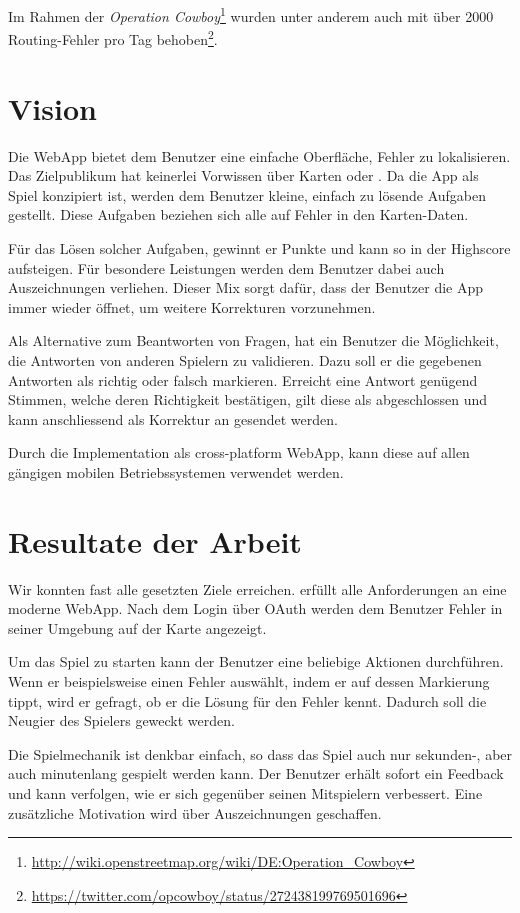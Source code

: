 Im Rahmen der \emph{Operation Cowboy}\footnote{\url{http://wiki.openstreetmap.org/wiki/DE:Operation_Cowboy}} wurden unter anderem auch mit  über 2000 \gls{Routing}-Fehler pro Tag behoben\footnote{\url{https://twitter.com/opcowboy/status/272438199769501696}}.

\section{Vision}
Die \gls{WebApp} \kort{} bietet dem Benutzer eine einfache Oberfläche, Fehler zu lokalisieren.
Das Zielpublikum hat keinerlei Vorwissen über Karten oder .
Da die App als Spiel konzipiert ist, werden dem Benutzer kleine, einfach zu lösende Aufgaben gestellt.
Diese Aufgaben beziehen sich alle auf Fehler in den Karten-Daten.

Für das Lösen solcher Aufgaben, gewinnt er Punkte und kann so in der Highscore aufsteigen.
Für besondere Leistungen werden dem Benutzer dabei auch Auszeichnungen verliehen.
Dieser Mix sorgt dafür, dass der Benutzer die App immer wieder öffnet, um weitere Korrekturen vorzunehmen.

Als Alternative zum Beantworten von Fragen, hat ein Benutzer die Möglichkeit, die Antworten von anderen Spielern zu validieren.
Dazu soll er die gegebenen Antworten als richtig oder falsch markieren.
Erreicht eine Antwort genügend Stimmen, welche deren Richtigkeit bestätigen, gilt diese als abgeschlossen und kann anschliessend als Korrektur an  gesendet werden.

Durch die Implementation als cross-platform \gls{WebApp}, kann diese auf allen gängigen mobilen Betriebssystemen verwendet werden.

\section{Resultate der Arbeit}
Wir konnten fast alle gesetzten Ziele erreichen.
\kort{} erfüllt alle Anforderungen an eine moderne \gls{WebApp}.
Nach dem Login über \gls{OAuth} werden dem Benutzer Fehler in seiner Umgebung auf der Karte angezeigt.

Um das Spiel zu starten kann der Benutzer eine beliebige Aktionen durchführen.
Wenn er beispielsweise einen Fehler auswählt, indem er auf dessen Markierung tippt, wird er gefragt, ob er die Lösung für den Fehler kennt.
Dadurch soll die Neugier des Spielers geweckt werden.

Die Spielmechanik ist denkbar einfach, so dass das Spiel auch nur sekunden-, aber auch  minutenlang gespielt werden kann.
Der Benutzer erhält sofort ein Feedback und kann verfolgen, wie er sich gegenüber seinen Mitspielern verbessert.
Eine zusätzliche Motivation wird über Auszeichnungen geschaffen.

